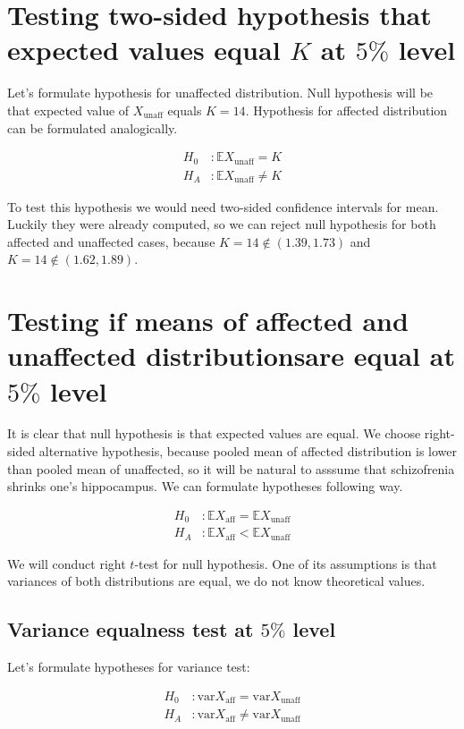 \documentclass[12pt,a4paper]{article} %
\newcommand{\randv}[2][X]{#1_{\text{#2}}}
\newcommand{\E}{\mathbb{E}}
\newcommand{\var}{\text{var}}
\begin{document}
\section{Testing two-sided hypothesis that expected values equal $K$ at $5\%$ level}

Let's formulate hypothesis for unaffected distribution. Null hypothesis will be that expected value of $\randv{unaff}$ equals $K = 14$. Hypothesis for affected distribution can be formulated analogically.

\begin{align*}
  H_0 &: \E\randv{unaff} = K \\
  H_A &: \E\randv{unaff} \neq K
\end{align*}

To test this hypothesis we would need two-sided confidence intervals for mean. Luckily they were already computed, so we can reject null hypothesis for both affected and unaffected cases, because $K = 14 \not\in (1.39, 1.73)$ and $K = 14 \not\in (1.62, 1.89)$.

\section{Testing if means of affected and unaffected distributionsare  equal at $5\%$ level}

It is clear that null hypothesis is that expected values are equal. We choose right-sided alternative hypothesis, because pooled mean of affected distribution is lower than pooled mean of unaffected, so it will be natural to asssume that schizofrenia shrinks one's hippocampus. We can formulate hypotheses following way.

\begin{align*}
  H_0 &: \E\randv{aff} = \E\randv{unaff}\\
  H_A &: \E\randv{aff} < \E\randv{unaff}
\end{align*}\label{Hypotheses}

We will conduct right $t$-test for null hypothesis. One of its assumptions is that variances of both distributions are equal, we do not know theoretical values.

\subsection{Variance equalness test at $5\%$ level}

Let's formulate hypotheses for variance test:

\begin{align*}
  H_0 &: \var\randv{aff} = \var\randv{unaff}\\
  H_A &: \var\randv{aff} \neq \var\randv{unaff}
\end{align*}
\end{document}

